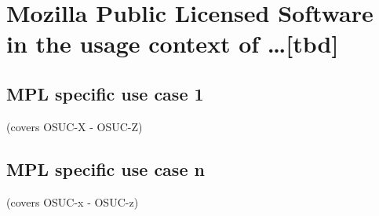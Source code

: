 %
%
%
%
%



\section{Mozilla Public Licensed Software in the usage context of \ldots [tbd]}
\label{OSUC-01-MPL} \label{OSUC-03-MPL} 
\label{OSUC-06-MPL} \label{OSUC-09-MPL}

\label{OSUC-02-MPL} \label{OSUC-04-MPL} \label{OSUC-05-MPL}
\label{OSUC-07-MPL} \label{OSUC-08-MPL} \label{OSUC-10-MPL}


\subsection{MPL specific use case 1}
(covers OSUC-X - OSUC-Z)

\subsection{MPL specific use case n}
(covers OSUC-x - OSUC-z)


%
